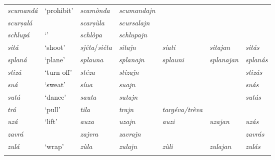 \begin{sidewaystable}
\begin{tabularx}{\textwidth}{lllllll}
		\textit{scumandá} & `prohibit' & \textit{scamònda} & \textit{scumandajn} \\
		\textit{scurṣalá} & & \textit{scarṣùla} & \textit{scursalajn} &\\
		\textit{schlupá} & `' & \textit{schlòpa} & \textit{schlupajn}\\
		\textit{sitá} & ‘shoot’ & \textit{sjéta}/\textit{siéta} & \textit{sitajn} & \textit{síati} & \textit{sitajan} & \textit{sitás}\\
		\textit{splaná} & ‘plane’ & \textit{splauna} & \textit{splanajn} & \textit{splauni} & \textit{splanajan} & \textit{splanás}\\
		\textit{stizá} & `turn off' & \textit{stéza} & \textit{stizajn} &  &  & \textit{stizás}\\
		\textit{suá} & `sweat' & \textit{síua} & \textit{suajn} & & & \textit{suás}\\
		\textit{sutá} & `dance' & \textit{sauta} & \textit{sutajn} & & & \textit{sutás}\\
		\textit{trá} & `pull' & \textit{tila} & \textit{trajn} & \textit{targéva/trèva}\\
		\textit{uzá} & ‘lift’ & \textit{auza} & \textit{uzajn} & \textit{auzi} & \textit{uzajan} & \textit{uzás} \\ 
		\textit{zavrá} & & \textit{zajvra} & \textit{zavrajn} & & & \textit{zavrás}\\
		\textit{zulá} & ‘wrap’ & \textit{zùla} & \textit{zulajn} & \textit{zùli} & \textit{zulajan} & \textit{zulás} \\
		
	\lspbottomrule

	\end{tabularx} 
\end{sidewaystable}

